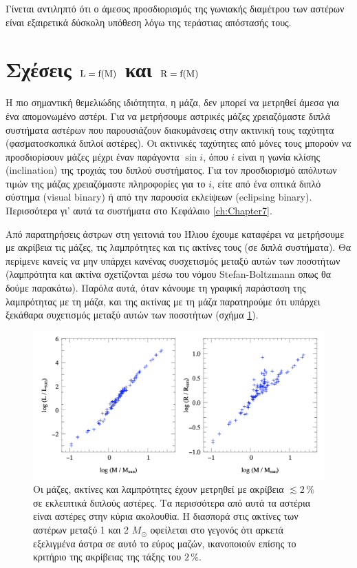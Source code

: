 Γίνεται αντιληπτό ότι ο άμεσος προσδιορισμός της γωνιακής διαμέτρου των αστέρων είναι εξαιρετικά δύσκολη υπόθεση λόγω της τεράστιας απόστασής τους.


\section{Σχέσεις $\rm L = f(M)$ και $\rm R = f(M)$}
Η πιο σημαντική θεμελιώδης ιδιότητητα, η μάζα, δεν μπορεί να μετρηθεί άμεσα για ένα απομονωμένο αστέρι. Για να μετρήσουμε αστρικές μάζες χρειαζόμαστε διπλά συστήματα αστέρων που παρουσιάζουν διακυμάνσεις στην ακτινική τους ταχύτητα (φασματοσκοπικά διπλοί αστέρες). Οι ακτινικές ταχύτητες από μόνες τους μπορούν να προσδιορίσουν μάζες μέχρι έναν παράγοντα $\sin i$, όπου $i$ είναι η γωνία κλίσης (inclination) της τροχιάς του διπλού συστήματος. Για τον προσδιορισμό απόλυτων τιμών της μάζας χρειαζόμαστε πληροφορίες για το $i$, είτε από ένα οπτικά διπλό σύστημα (visual binary) ή από την παρουσία εκλείψεων (eclipsing binary). Περισσότερα γι' αυτά τα συστήματα στο Κεφάλαιο  \ref{ch:Chapter7}. 

Από παρατηρήσεις άστρων στη γειτονιά του Ήλιου έχουμε καταφέρει να μετρήσουμε με ακρίβεια τις μάζες, τις λαμπρότητες και τις ακτίνες τους (σε διπλά συστήματα). Θα περίμενε κανείς να μην υπάρχει κανένας συσχετισμός μεταξύ αυτών των ποσοτήτων (λαμπρότητα και ακτίνα σχετίζονται μέσω του νόμου Stefan-Boltzmann οπως θα δούμε παρακάτω). Παρόλα αυτά, όταν κάνουμε τη γραφική παράσταση της λαμπρότητας με τη μάζα, και της ακτίνας με τη μάζα παρατηρούμε ότι υπάρχει ξεκάθαρα συχετισμός μεταξύ αυτών των ποσοτήτων (σχήμα \ref{fig:luminosity_mass_relation}).

\begin{figure}[h]
    \centering
    \includegraphics[width=\linewidth]{Figures/luminosity_mass_relation.png}
    \caption{Οι μάζες, ακτίνες και λαμπρότητες έχουν μετρηθεί με ακρίβεια $\lesssim 2 \,\%$ σε εκλειπτικά διπλούς αστέρες. Τα περισσότερα από αυτά τα αστέρια είναι αστέρες στην κύρια ακολουθία. Η διασπορά στις ακτίνες των αστέρων μεταξύ 1 και 2 $M_{\odot}$ οφείλεται στο γεγονός ότι αρκετά εξελιγμένα άστρα σε αυτό το εύρος μαζών, ικανοποιούν επίσης το κριτήριο της ακρίβειας της τάξης του $2 \,\%$.}
    \label{fig:luminosity_mass_relation}
\end{figure}

